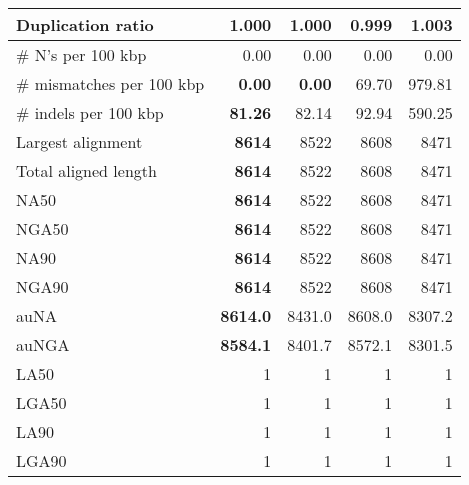 \documentclass[12pt,a4paper]{article}
\begin{document}
\begin{table}[ht]
\begin{center}
\begin{tabular}{|l*{4}{|r}|}
Duplication ratio & 1.000 & 1.000 & {\bf 0.999} & 1.003 \\ \hline
\# N's per 100 kbp & 0.00 & 0.00 & 0.00 & 0.00 \\ \hline
\# mismatches per 100 kbp & {\bf 0.00} & {\bf 0.00} & 69.70 & 979.81 \\ \hline
\# indels per 100 kbp & {\bf 81.26} & 82.14 & 92.94 & 590.25 \\ \hline
Largest alignment & {\bf 8614} & 8522 & 8608 & 8471 \\ \hline
Total aligned length & {\bf 8614} & 8522 & 8608 & 8471 \\ \hline
NA50 & {\bf 8614} & 8522 & 8608 & 8471 \\ \hline
NGA50 & {\bf 8614} & 8522 & 8608 & 8471 \\ \hline
NA90 & {\bf 8614} & 8522 & 8608 & 8471 \\ \hline
NGA90 & {\bf 8614} & 8522 & 8608 & 8471 \\ \hline
auNA & {\bf 8614.0} & 8431.0 & 8608.0 & 8307.2 \\ \hline
auNGA & {\bf 8584.1} & 8401.7 & 8572.1 & 8301.5 \\ \hline
LA50 & 1 & 1 & 1 & 1 \\ \hline
LGA50 & 1 & 1 & 1 & 1 \\ \hline
LA90 & 1 & 1 & 1 & 1 \\ \hline
LGA90 & 1 & 1 & 1 & 1 \\ \hline
\end{tabular}
\end{center}
\end{table}
\end{document}

